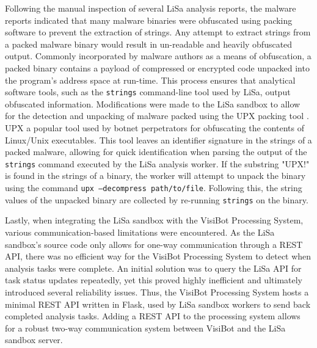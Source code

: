 Following the manual inspection of several LiSa analysis reports, the malware reports indicated that many malware binaries were obfuscated using packing software to prevent the extraction of strings. Any attempt to extract strings from a packed malware binary would result in un-readable and heavily obfuscated output. Commonly incorporated by malware authors as a means of obfuscation, a packed binary contains a payload of compressed or encrypted code unpacked into the program's address space at run-time. \citep{Roundy2013} This process ensures that analytical software tools, such as the \texttt{strings} command-line tool \citep{Strings} used by LiSa, output obfuscated information. Modifications were made to the LiSa sandbox to allow for the detection and unpacking of malware packed using the UPX packing tool \citep{UPX}. UPX a popular tool used by botnet perpetrators for obfuscating the contents of Linux/Unix executables. This tool leaves an identifier signature in the strings of a packed malware, allowing for quick identification when parsing the output of the \texttt{strings} command executed by the LiSa analysis worker. If the substring "UPX!" is found in the strings of a binary, the worker will attempt to unpack the binary using the command \texttt{upx --decompress path/to/file}. Following this, the string values of the unpacked binary are collected by re-running \texttt{strings} on the binary.

Lastly, when integrating the LiSa sandbox with the VisiBot Processing System, various communication-based limitations were encountered. As the LiSa sandbox's source code only allows for one-way communication through a REST API, there was no efficient way for the VisiBot Processing System to detect when analysis tasks were complete. An initial solution was to query the LiSa API for task status updates repeatedly, yet this proved highly inefficient and ultimately introduced several reliability issues. Thus, the VisiBot Processing System hosts a minimal REST API written in Flask, \citep{Flask} used by LiSa sandbox workers to send back completed analysis tasks. Adding a REST API to the processing system allows for a robust two-way communication system between VisiBot and the LiSa sandbox server.

